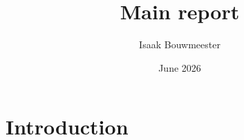 \documentclass{article}
\title{Main report}
\author{Isaak Bouwmeester}
\date{June 2026}
\begin{document}
\maketitle

\section{Introduction}
\end{document}
